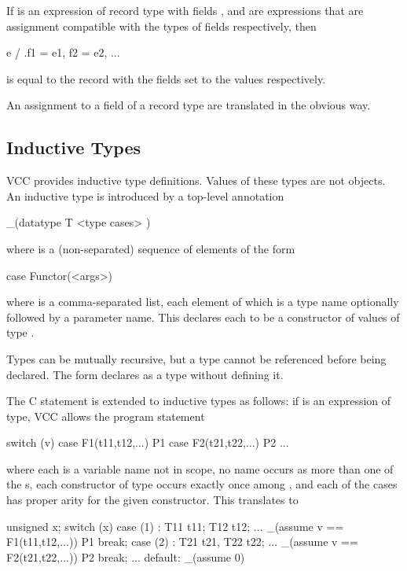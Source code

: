 \documentclass[preprint,nocopyrightspace]{sigplanconf}
\begin{document}
{{{If  is an expression of record type with
fields , and  are expressions that are
assignment compatible with the types of fields 
respectively, then
\begin{VCC}
  e / { .f1 = e1, f2 = e2, ...}
\end{VCC}
is equal to the record  with the fields  set
to the values  respectively.

An assignment to a field of a record type are translated in the
obvious way.


\subsection{Inductive Types}
VCC provides inductive type definitions. Values of these types are not
objects.  An inductive type is introduced by a top-level annotation
\begin{VCC}
  _(datatype T {
    <type cases>
  })
\end{VCC}
where  is a (non-separated) sequence of elements of the form
\begin{VCC}
  case Functor(<args>)
\end{VCC}
where  is a comma-separated list, each element of which is
a type name optionally followed by a parameter name. This
declares each  to be a constructor of values of
type . 

Types can be mutually recursive, but a type cannot be referenced
before being declared. The form  declares  as a
type without defining it.

The C  statement is extended to inductive types as
follows: if  is an expression of type, VCC allows the program statement 
\begin{VCC}
switch (v) {
  case F1(t11,t12,...) { P1 }
  case F2(t21,t22,...) { P2 }
  ...
}
\end{VCC}
where each  is a variable name not in scope, no name occurs
as more than one of the s, each constructor of type 
occurs exactly once among , and each of the cases has
proper arity for the given constructor. 
This translates to 
\begin{VCC}
{
  unsigned x;
  switch (x) {
    case (1) : {
      T11 t11; T12 t12; ...
      _(assume v == F1(t11,t12,...))
      { P1 }
      break;
    } case (2) : {
      T21 t21, T22 t22; ...
      _(assume v == F2(t21,t22,...))
      { P2 }
      break;
    } ...
    default: _(assume 0)
  }
}
\end{VCC}

}}}
\end{document}
